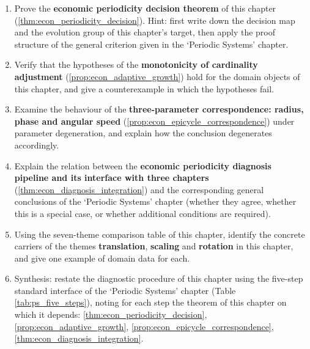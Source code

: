 \begin{enumerate}[leftmargin=3em, label=\textbf{Exercise \arabic*}]
    \item Prove the \textbf{economic periodicity decision theorem} of this chapter (\ref{thm:econ_periodicity_decision}). Hint: first write down the decision map and the evolution group of this chapter's target, then apply the proof structure of the general criterion given in the `Periodic Systems' chapter.

    \item Verify that the hypotheses of the \textbf{monotonicity of cardinality adjustment} (\ref{prop:econ_adaptive_growth}) hold for the domain objects of this chapter, and give a counterexample in which the hypotheses fail.

    \item Examine the behaviour of the \textbf{three-parameter correspondence: radius, phase and angular speed} (\ref{prop:econ_epicycle_correspondence}) under parameter degeneration, and explain how the conclusion degenerates accordingly.

    \item Explain the relation between the \textbf{economic periodicity diagnosis pipeline and its interface with three chapters} (\ref{thm:econ_diagnosis_integration}) and the corresponding general conclusions of the `Periodic Systems' chapter (whether they agree, whether this is a special case, or whether additional conditions are required).

    \item Using the seven-theme comparison table of this chapter, identify the concrete carriers of the themes \textbf{translation}, \textbf{scaling} and \textbf{rotation} in this chapter, and give one example of domain data for each.

    \item Synthesis: restate the diagnostic procedure of this chapter using the five-step standard interface of the `Periodic Systems' chapter (Table \ref{tab:ps_five_steps}), noting for each step the theorem of this chapter on which it depends: \ref{thm:econ_periodicity_decision}, \ref{prop:econ_adaptive_growth}, \ref{prop:econ_epicycle_correspondence}, \ref{thm:econ_diagnosis_integration}.
\end{enumerate}


